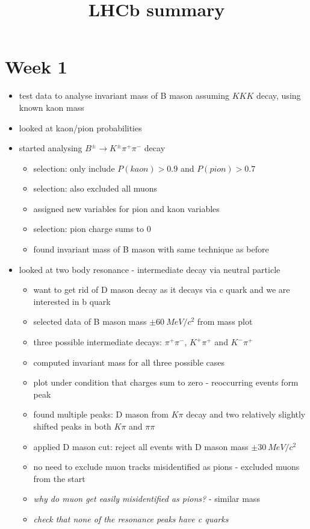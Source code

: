 \documentclass[10pt]{article}
\begin{document}
\title{LHCb summary}
\date{}
\maketitle
\section{Week 1}
\begin{itemize}
\item test data to analyse invariant mass of B mason assuming $KKK$ decay, using known kaon mass
\item looked at kaon/pion probabilities
\item started analysing $B^{\pm} \rightarrow K^{\pm}\pi^+\pi^-$ decay
\begin{itemize}
\item selection: only include $P(kaon) > 0.9$ and $P(pion) > 0.7$
\item selection: also excluded all muons
\item assigned new variables for pion and kaon variables
\item selection: pion charge sums to 0
\item found invariant mass of B mason with same technique as before
\end{itemize}
\item looked at two body resonance - intermediate decay via neutral particle
\begin{itemize}
\item want to get rid of  D mason decay as it decays via c quark and we are interested in b quark
\item selected data of B mason mass $\pm 60~MeV/c^2$ from mass plot 
\item three possible intermediate decays: $\pi^+\pi^-$, $K^+\pi^+$ and $K^-\pi^+$
\item computed invariant mass for all three possible cases
\item plot under condition that charges sum to zero - reoccurring events form peak
\item found multiple peaks: D mason from $K\pi$ decay and two relatively slightly shifted peaks in both $K\pi$ and $\pi \pi$
\item applied D mason cut: reject all events with D mason mass $\pm 30 ~MeV/c^2$
\item no need to exclude muon tracks misidentified as pions - excluded muons from the start
\item \textit{why do muon get easily misidentified as pions?} - similar mass
\item \textit{check that none of the resonance peaks have c quarks}
\end{itemize}
\end{itemize}
\end{document}
